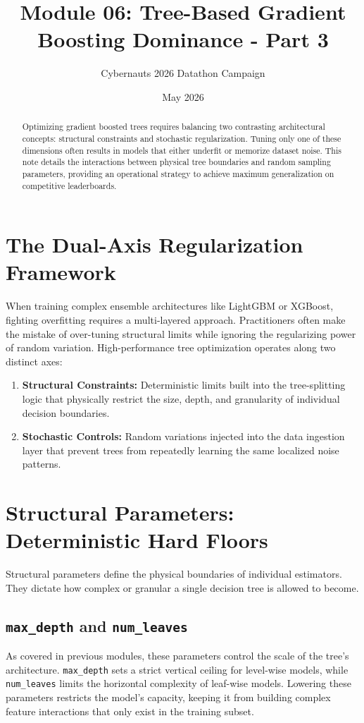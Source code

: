 \documentclass{article}
\title{Module 06: Tree-Based Gradient Boosting Dominance - Part 3}
\author{Cybernauts 2026 Datathon Campaign}
\date{May 2026}
\begin{document}
\maketitle

\begin{abstract}
Optimizing gradient boosted trees requires balancing two contrasting architectural concepts: structural constraints and stochastic regularization. Tuning only one of these dimensions often results in models that either underfit or memorize dataset noise. This note details the interactions between physical tree boundaries and random sampling parameters, providing an operational strategy to achieve maximum generalization on competitive leaderboards.
\end{abstract}

\tableofcontents
\newpage

\section{The Dual-Axis Regularization Framework}
When training complex ensemble architectures like LightGBM or XGBoost, fighting overfitting requires a multi-layered approach. Practitioners often make the mistake of over-tuning structural limits while ignoring the regularizing power of random variation. High-performance tree optimization operates along two distinct axes:

\begin{enumerate}
    \item \textbf{Structural Constraints:} Deterministic limits built into the tree-splitting logic that physically restrict the size, depth, and granularity of individual decision boundaries.
    \item \textbf{Stochastic Controls:} Random variations injected into the data ingestion layer that prevent trees from repeatedly learning the same localized noise patterns.
\end{enumerate}

\section{Structural Parameters: Deterministic Hard Floors}
Structural parameters define the physical boundaries of individual estimators. They dictate how complex or granular a single decision tree is allowed to become.

\subsection{\texttt{max\_depth} and \texttt{num\_leaves}}
As covered in previous modules, these parameters control the scale of the tree's architecture. \texttt{max\_depth} sets a strict vertical ceiling for level-wise models, while \texttt{num\_leaves} limits the horizontal complexity of leaf-wise models. Lowering these parameters restricts the model's capacity, keeping it from building complex feature interactions that only exist in the training subset.
\end{document}

